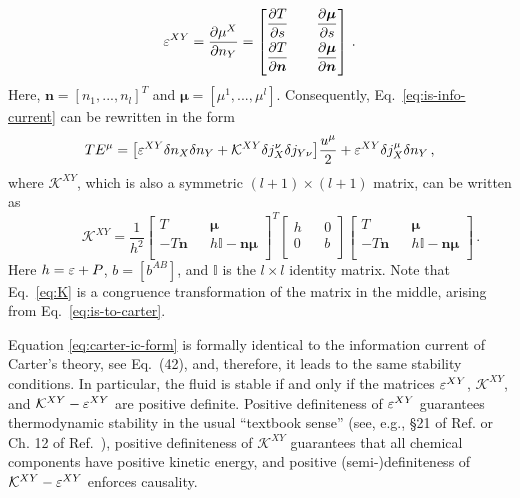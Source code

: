 \documentclass[
a4paper,
amsfonts,
amsmath,
reprint,
showkeys,
nofootinbib,
twoside,
onecolumn,
notitlepage
]{revtex4-1}
\newcommand{\spc}{\quad \quad \quad}
\newcommand{\n}{{\bm{n}}}
\newcommand{\m}{{\bm{\mu}}}
\begin{document}
	\begin{equation}
		\dermat^{XY}=\dfrac{\partial \mu^X}{\partial n_Y}=
		\begin{bmatrix}
			\dfrac{\partial T}{\partial s} & & \dfrac{\partial \m}{\partial s}  \\[7pt]
			\dfrac{\partial T}{\partial \n} & & \dfrac{\partial \m}{\partial \n} \\[7pt]
		\end{bmatrix}\,.
	\end{equation}
	Here, $\n{=}[n_1,...,n_l]^T$ and $\m{=}[\mu^1,...,\mu^l]$.
	Consequently, Eq.\ \eqref{eq:is-info-current} can be rewritten in the form
	\begin{equation}\label{eq:carter-ic-form}
		TE^\mu = \big[\varepsilon^{XY} \delta n_X \delta n_Y + \mathcal{K}^{XY}\delta j_X^\nu \delta j_{Y\nu}  \big] \dfrac{u^\mu}{2} + \varepsilon^{XY} \delta j_X^\mu \delta n_Y \,,
	\end{equation}
	where $\mathcal{K}^{XY}$, which is also a symmetric $(l+1)\times(l+1)$ matrix, can be written as
	\begin{equation}\label{eq:K}
		\spc \mathcal{K}^{XY}= \dfrac{1}{h^2}
		\begin{bmatrix}
			T & & \m \\
			-T \n & & h\mathbb{I}- \n \m \\
		\end{bmatrix}^T 
		\begin{bmatrix}
			h & & 0 \\
			0 & & b \\
		\end{bmatrix}
		\begin{bmatrix}
			T & & \m \\
			-T \n & & h\mathbb{I}- \n \m \\
		\end{bmatrix}\,.
	\end{equation}
	Here $h=\varepsilon+P$, $b=[b^{AB}]$, and $\mathbb{I}$ is the $l\times l$ identity matrix.
	Note that Eq.\ \eqref{eq:K} is a congruence transformation of the matrix in the middle, arising from Eq.\ \eqref{eq:is-to-carter}.
	
	Equation \eqref{eq:carter-ic-form} is formally identical to the information current of Carter's theory, see \cite{GavassinoStabilityCarter2022} Eq.\ (42), and, therefore, it leads to the same stability conditions. 
 In particular, the fluid is stable if and only if the matrices $\varepsilon^{XY}$, $\mathcal{K}^{XY}$, and $\mathcal{K}^{XY}-\varepsilon^{XY}$ are positive definite. 
	Positive definiteness of $\varepsilon^{XY}$ guarantees thermodynamic stability in the usual ``textbook sense'' (see, e.g., \S 21 of Ref. \cite{landau5} or Ch. 12 of Ref.\ \cite{PrigoginebookModernThermodynamics2014}), positive definiteness of $\mathcal{K}^{XY}$ guarantees that all chemical components have positive kinetic energy, and positive (semi-)definiteness of $\mathcal{K}^{XY}-\varepsilon^{XY}$ enforces causality.
 
\end{document}
